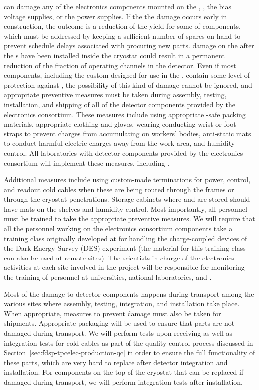  can damage any of the electronics
components mounted on the , ,
the bias voltage supplies, or the power supplies. If the
the damage occurs early in construction, 
the outcome is a reduction
of the yield for some of components, which must be
addressed by keeping a sufficient number of spares on hand to prevent
schedule delays associated with procuring new parts. 
damage on the  after the s have been
installed inside the cryostat could result in a permanent
reduction of the fraction of operating channels in the
detector. Even if most components, including the custom 
 designed for use in the , contain 
some level of protection  against , the possibility of this kind of damage cannot be ignored, and appropriate 
preventive measures must be taken during  
assembly, testing, installation, and shipping of all of the detector 
components provided by the  electronics consortium. These 
measures include using appropriate -safe packing materials, 
appropriate clothing and gloves, wearing conducting wrist or foot straps 
to prevent charges from accumulating 
on workers' bodies, anti-static mats to conduct harmful electric 
charges away from the work area, and humidity control. All laboratories with detector components provided by the  electronics consortium will implement these
measures, including . 

Additional measures
include using custom-made terminations for 
power, control, and readout cold cables when these
are being routed through the  frames or through the
cryostat penetrations. Storage cabinets where  and
 are stored should have  mats
on the shelves and humidity control. Most importantly, all personnel must be trained to take the appropriate preventive measures. We 
will require that all the personnel working on the  electronics 
consortium components take a training class originally developed 
at  for handling the charge-coupled devices of the Dark Energy Survey (DES) experiment 
(the material for this training class can also be used at remote 
sites). The scientists in charge of the  electronics activities at each site involved in the project will be responsible for monitoring the training of personnel at universities, national laboratories,
and .

Most of the damage to detector components happens during 
transport among the various sites where assembly, testing, integration,
and installation take place. When appropriate, measures to prevent
 damage must also be taken for shipments. Appropriate 
packaging will be used to ensure that parts are not damaged
during transport. We will perform tests upon receiving  
 as well as integration tests for cold cables as
part of the quality control process discussed in 
Section~\ref{sec:fdsp-tpcelec-production-qc} in order to ensure the 
full functionality of these parts, which are very hard to replace 
after detector integration and installation. For  
components on the top of the cryostat that
can be replaced if damaged during transport, we will 
perform integration tests after installation.

